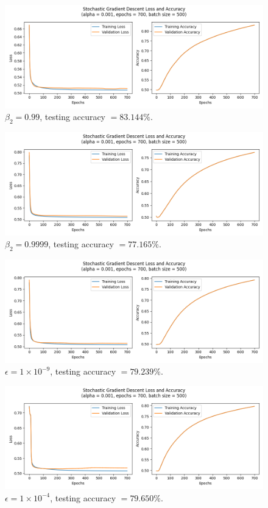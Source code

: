 \documentclass[letter]{article}
\begin{document}
\begin{figure}[H]
	\centering
	\includegraphics[width=\linewidth]{Figure_13}
	\caption{$\beta_2 = 0.99$, testing accuracy $ = 83.144\%$.}
	\label{fig:plot13}
\end{figure}

\begin{figure}[H]
	\centering
	\includegraphics[width=\linewidth]{Figure_14}
	\caption{$\beta_2 = 0.9999$, testing accuracy $ = 77.165\%$.}
	\label{fig:plot14}
\end{figure}

\begin{figure}[H]
	\centering
	\includegraphics[width=\linewidth]{Figure_15}
	\caption{$\epsilon = 1 \times 10^{-9}$, testing accuracy $ = 79.239\%$.}
	\label{fig:plot15}
\end{figure}

\begin{figure}[H]
	\centering
	\includegraphics[width=\linewidth]{Figure_16}
	\caption{$\epsilon = 1 \times 10^{-4}$, testing accuracy $ = 79.650\%$.}
	\label{fig:plot16}
\end{figure}
\end{document}
